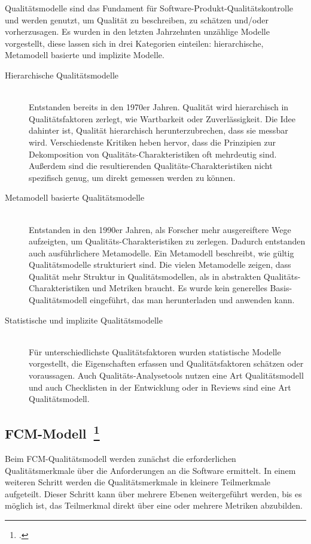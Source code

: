 Qualitätsmodelle sind das Fundament für Software-Produkt-Qualitätskontrolle und werden genutzt, um Qualität zu beschreiben, zu schätzen und/oder vorherzusagen.
Es wurden in den letzten Jahrzehnten unzählige Modelle vorgestellt, diese lassen sich in drei Kategorien einteilen: hierarchische, Metamodell basierte und implizite Modelle.

\begin{description}
  \item[Hierarchische Qualitätsmodelle] \hfill \\ Entstanden bereits in den 1970er Jahren. Qualität wird hierarchisch in Qualitätsfaktoren zerlegt, wie Wartbarkeit oder Zuverlässigkeit. Die Idee dahinter ist, Qualität hierarchisch herunterzubrechen, dass sie messbar wird. Verschiedenste Kritiken heben hervor, dass die Prinzipien zur Dekomposition von Qualitäts-Charakteristiken oft mehrdeutig sind. Außerdem sind die resultierenden Qualitäts-Charakteristiken nicht spezifisch genug, um direkt gemessen werden zu können.
  \item[Metamodell basierte Qualitätsmodelle] \hfill \\ Entstanden in den 1990er Jahren, als Forscher mehr ausgereiftere Wege aufzeigten, um Qualitäts-Charakteristiken zu zerlegen. Dadurch entstanden auch ausführlichere Metamodelle. Ein Metamodell beschreibt, wie gültig Qualitätsmodelle strukturiert sind. Die vielen Metamodelle zeigen, dass Qualität mehr Struktur in Qualitätsmodellen, als in abstrakten Qualitäts-Charakteristiken und Metriken braucht. Es wurde kein generelles Basis-Qualitätsmodell eingeführt, das man herunterladen und anwenden kann.
  \item[Statistische und implizite Qualitätsmodelle] \hfill \\ Für unterschiedlichste Qualitätsfaktoren wurden statistische Modelle vorgestellt, die Eigenschaften erfassen und Qualitätsfaktoren schätzen oder voraussagen. Auch Qualitäts-Analysetools nutzen eine Art Qualitätsmodell und auch Checklisten in der Entwicklung oder in Reviews sind eine Art Qualitätsmodell.
\end{description}

\clearpage
\subsection[\ac{FCM}-Modell]{\acf{FCM}-Modell~\footcite[vgl.][S.668ff]{abts_masterkurs_2009}}

Beim \ac{FCM}-Qualitätsmodell werden zunächst die erforderlichen Qualitätsmerkmale über die Anforderungen an die Software ermittelt.
In einem weiteren Schritt werden die Qualitätsmerkmale in kleinere Teilmerkmale aufgeteilt.
Dieser Schritt kann über mehrere Ebenen weitergeführt werden, bis es möglich ist, das Teilmerkmal direkt über eine oder mehrere Metriken abzubilden.

